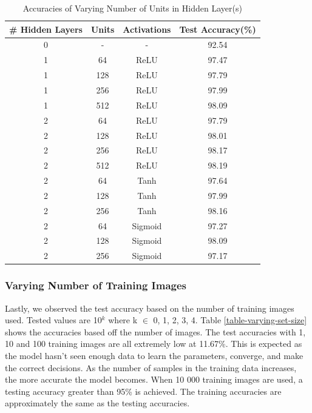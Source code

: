 \documentclass[11pt]{homework}
\begin{document}
\begin{table}[h!] 
\centering
\begin{tabular}{||c c c c||} 
\hline
 # Hidden Layers & Units & Activations &  Test Accuracy(\%) \\ [0.5ex]
 \hline\hline
 0 & -   & -          & 92.54   \\ 
\hline
 1 & 64  & ReLU       & 97.47   \\
 1 & 128 & ReLU       & 97.79   \\
 1 & 256 & ReLU       & 97.99   \\
 1 & 512 & ReLU       & 98.09   \\
 2 & 64  & ReLU       & 97.79   \\
 2 & 128 & ReLU       & 98.01   \\
 2 & 256 & ReLU       & 98.17   \\
 2 & 512 & ReLU       & 98.19   \\ 
\hline
 2 & 64  & Tanh       & 97.64   \\
 2 & 128 & Tanh       & 97.99   \\
 2 & 256 & Tanh       & 98.16   \\
\hline
 2 & 64  & Sigmoid    & 97.27   \\ 
 2 & 128 & Sigmoid    & 98.09   \\ 
 2 & 256 & Sigmoid    & 97.17   \\ 
 \hline
\end{tabular}
\caption{Accuracies of Varying Number of Units in Hidden Layer(s)}
\label{table-hidden-units}
\end{table}

\subsubsection{Varying Number of Training Images}
Lastly, we observed the test accuracy based on the number of training images used. Tested values are 10$^k$ where  k $\in$ {0, 1, 2, 3, 4}. Table \ref{table-varying-set-size} shows the accuracies based off the number of images. The test accuracies with 1, 10 and 100 training images are all extremely low at 11.67\%. This is expected as the model hasn't seen enough data to learn the parameters, converge, and make the correct decisions. As the number of samples in the training data increases, the more accurate the model becomes. When 10 000 training images are used, a testing accuracy greater than 95\% is achieved. The training accuracies are approximately the same as the testing accuracies. 
\end{document}

